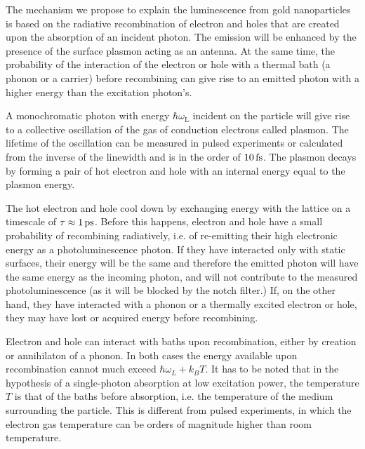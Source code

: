 The mechanism we propose to explain the luminescence from gold nanoparticles is
based on the radiative recombination of electron and holes that are created upon
the absorption of an incident photon\cite{Dulkeith2004,Mooradian1969}. The
emission will be enhanced by the presence of the surface plasmon acting as an
antenna\cite{Mohamed2000}. At the same time, the probability of the interaction
of the electron or hole with a thermal bath (a phonon or a carrier) before
recombining can give rise to an emitted photon with a higher energy than the
excitation photon's\cite{Hodak2000,Giri2015,Arbouet2003a}.

A monochromatic photon with energy $\hbar\omega_\textrm{L}$ incident on the
particle will give rise to a collective oscillation of the gas of conduction
electrons called plasmon. The lifetime of the oscillation can be measured in
pulsed experiments or calculated from the inverse of the linewidth and is in the
order of $10\,\textrm{fs}$\cite{Sonnichsen2002}. The plasmon decays by forming a pair of
hot electron and hole with an internal energy equal to the plasmon
energy\cite{Sundararaman2014,Brongersma2015,AlejandroManjavacasJunG.LiuVikramKulkarni2014}.

The hot electron and hole cool down by exchanging energy with the lattice on a
timescale of $\tau\approx1\,\textrm{ps}$\cite{Pustovalov2005}. Before this happens,
electron and hole have a small probability of recombining radiatively, i.e. of 
re-emitting their high electronic energy as a photoluminescence photon. If they
have interacted only with static surfaces, their energy will be the same and
therefore the emitted photon will have the same energy as the incoming
photon, and will not contribute to the measured photoluminescence (as it will be
blocked by the notch filter.) If, on the other hand, they have interacted with a
phonon or a thermally excited electron or hole, they may have lost or acquired
energy before recombining.

Electron and hole can interact with baths upon recombination, either by
creation or annihilaton of a phonon. In both cases the energy available upon
recombination cannot much exceed $\hbar\omega_L+k_BT$. It has to be noted that
in the hypothesis of a single-photon absorption at low excitation power, the
temperature $T$ is that of the baths before absorption, i.e. the temperature of
the medium surrounding the particle. This is different from pulsed experiments,
in which the electron gas temperature can be orders of magnitude higher than
room temperature\cite{Baffou2013a}. 

